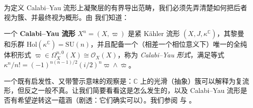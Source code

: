 为定义 Calabi--Yau 流形上凝聚层的有界导出范畴，我们必须先弄清楚如何把后者视为簇、并最终视为概形。由 \cite[第 7.2 节]{[Imp21]} 我们知道：

\begin{Def}\label{Calabiyauman}
	一个 \textbf{Calabi--Yau 流形} $X^n=(X,\varpi)$ 是紧 Kähler 流形 $(X,J,\kappa^\mathbb{C})$，其黎曼和乐群 $\text{Hol}(\kappa^\mathbb{C})=\text{SU}(n)$，并且配备一个（相差一个相位意义下）唯一的全纯体积形式 $\varpi\in\Omega_X^{n,0}(X)\cong\mathcal{O}_X(X)$，称为 \textit{Calabi--Yau 形式}，满足等式 $\kappa^n/n!=(-1)^{n(n-1)/2}(i/2)^n\varpi\wedge\overline{\varpi}$。
\end{Def}


一个既有启发性、又带警示意味的观察是：$\mathbb{C}$ 上的光滑（抽象）簇可以解释为复流形，但反之一般不真。让我们简要看看这是怎么发生的，以及 Calabi--Yau 流形是否有希望逆转这一蕴涵（剧透：它们确实可以）。我们参阅 \cite[附录 B]{[Har77]} 与 \cite{[Vak17]}。

